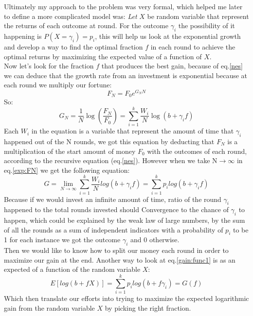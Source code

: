 \documentclass{article}
\begin{document}
	Ultimately my approach to the problem was very formal, which helped me later to define a more complicated model was:\newline
	\textit{Let} $X$ be random variable that represent the returns of each outcome at round. For the outcome $\gamma_i$ the possibility of it happening is $P(X=\gamma_i) = p_i$, this will help us look at the exponential growth and develop a way to find the optimal fraction $f$ in each round to achieve the optimal returns by maximizing the expected value of a function of $X$.
	\\
	Now let's look for the fraction \(f\) that produces the best gain, because of eq.\ref{nes} we can deduce that the growth rate from an investment is exponential because at each round we multiply our fortune:
	\begin{equation}
		\label{exp:FN}
		F_N = F_0e^{G_{N}N}
	\end{equation}
	So: 
	\[G_N = \frac{1}{N}\log(\frac{F_N}{F_0}) = \sum_{i=1}^{k} \frac{W_i}{N}\log(b + \gamma_i f)\]
	Each $W_i$ in the equation is a variable that represent the amount of time that $\gamma_i$ happened out of the N rounds, we got this equation by deducting that $F_N$ is a multiplication of the start amount of money 
	$F_0$ with the outcomes of each round, according to the recursive equation (eq.\ref{nes}).
	However when we take N\(\to\)\(\infty\) in eq.\ref{exp:FN} we get the following equation:
	\begin{equation}
		\label{gain:func1}
		G = \lim_{N \to \infty} \sum_{i=1}^{k} \frac{W_i}{N}log(b+\gamma_i f) = \sum_{i=1}^{k} p_i log(b+\gamma_i f)
	\end{equation}
	Because if we would invest an infinite amount of time, ratio of the round $\gamma_i$ happened to the total rounds invested should Convergence to the chance of $\gamma_i$ to happen, which could be explained by the weak law of large numbers, by the sum of all the rounds as a sum of independent indicators with a probability of $p_i$ to be 1 for each instance we got the outcome $\gamma_i$ and 0 otherwise.\\
	Then we would like to know how to split our money each round in order to maximize our gain at the end.
	\newline
	Another way to look at eq.\ref{gain:func1} is as an expected of a function of the random variable $X$:
	\[E[log(b + fX)] = \sum_{i=1}^{k} p_i log(b+f \gamma_i ) = G(f)\]
	Which then translate our efforts into trying to maximize the expected logarithmic gain from the random variable $X$ by picking the right fraction.
\end{document}
